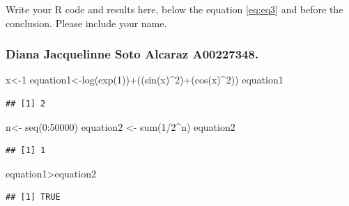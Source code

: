 \documentclass[12pt,halfline,a4paper,]{ouparticle}
\newenvironment{Shaded}{\begin{snugshade}}{\end{snugshade}}
\newcommand{\DecValTok}[1]{\textcolor[rgb]{0.00,0.00,0.81}{#1}}
\newcommand{\FunctionTok}[1]{\textcolor[rgb]{0.00,0.00,0.00}{#1}}
\newcommand{\NormalTok}[1]{#1}
\newcommand{\OtherTok}[1]{\textcolor[rgb]{0.56,0.35,0.01}{#1}}
\newcommand{\SpecialCharTok}[1]{\textcolor[rgb]{0.00,0.00,0.00}{#1}}
\begin{document}
Write your R code and results here, below the equation \ref{eq:eq3} and
before the conclusion. Please include your name.

\hypertarget{diana-jacquelinne-soto-alcaraz-a00227348.}{%
\subsubsection{Diana Jacquelinne Soto Alcaraz
A00227348.}\label{diana-jacquelinne-soto-alcaraz-a00227348.}}

\begin{Shaded}
\begin{Highlighting}[]
\NormalTok{x}\OtherTok{\textless{}{-}}\DecValTok{1}
\NormalTok{equation1}\OtherTok{\textless{}{-}}\FunctionTok{log}\NormalTok{(}\FunctionTok{exp}\NormalTok{(}\DecValTok{1}\NormalTok{))}\SpecialCharTok{+}\NormalTok{((}\FunctionTok{sin}\NormalTok{(x)}\SpecialCharTok{\^{}}\DecValTok{2}\NormalTok{)}\SpecialCharTok{+}\NormalTok{(}\FunctionTok{cos}\NormalTok{(x)}\SpecialCharTok{\^{}}\DecValTok{2}\NormalTok{))}
\NormalTok{equation1}
\end{Highlighting}
\end{Shaded}

\begin{verbatim}
## [1] 2
\end{verbatim}

\begin{Shaded}
\begin{Highlighting}[]
\NormalTok{n}\OtherTok{\textless{}{-}} \FunctionTok{seq}\NormalTok{(}\DecValTok{0}\SpecialCharTok{:}\DecValTok{50000}\NormalTok{)}
\NormalTok{equation2 }\OtherTok{\textless{}{-}} \FunctionTok{sum}\NormalTok{(}\DecValTok{1}\SpecialCharTok{/}\DecValTok{2}\SpecialCharTok{\^{}}\NormalTok{n)}
\NormalTok{equation2}
\end{Highlighting}
\end{Shaded}

\begin{verbatim}
## [1] 1
\end{verbatim}

\begin{Shaded}
\begin{Highlighting}[]
\NormalTok{equation1}\SpecialCharTok{\textgreater{}}\NormalTok{equation2}
\end{Highlighting}
\end{Shaded}

\begin{verbatim}
## [1] TRUE
\end{verbatim}
\end{document}
